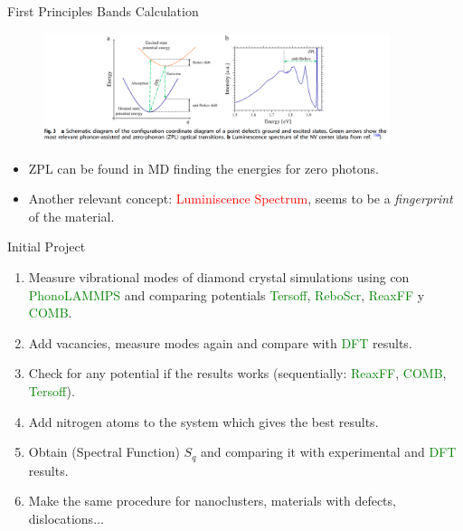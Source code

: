 \documentclass[11pt]{beamer}
\begin{document}
\begin{frame}{First Principles Bands Calculation}
\begin{figure}
 \centering
    \includegraphics[width=0.9\textwidth]{zpl.png}
 \end{figure}
\begin{itemize}
    \item ZPL can be found in MD finding the energies for zero photons.
    \item Another relevant concept: \textcolor{red}{Luminiscence Spectrum}, seems to be a \textit{fingerprint} of the material.
\end{itemize} 
 \end{frame}

\begin{frame}{Initial Project}
\begin{enumerate}
    \item Measure vibrational modes of diamond crystal simulations using con \textcolor{green}{Phono\textcolor{green}{LAMMPS}} and comparing potentials \textcolor{green}{Tersoff}, \textcolor{green}{ReboScr}, \textcolor{green}{ReaxFF} y \textcolor{green}{COMB}.
    \item Add vacancies, measure modes again and compare with \textcolor{green}{DFT} results.
    \item Check for any potential if the results works (sequentially: \textcolor{green}{ReaxFF}, \textcolor{green}{COMB}, \textcolor{green}{Tersoff}). 
    \item Add nitrogen atoms to the system which gives the best results.
    \item Obtain (Spectral Function) $S_q$ and comparing it with experimental and \textcolor{green}{DFT} results.
    \item Make the same procedure for nanoclusters, materials with defects, dislocations...
     \end{enumerate}
\end{frame}
\end{document}
